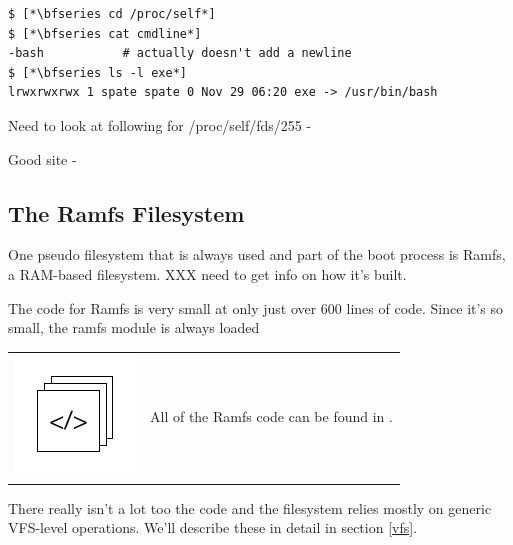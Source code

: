 \begin{lstlisting}
$ [*\bfseries cd /proc/self*]
$ [*\bfseries cat cmdline*]
-bash           # actually doesn't add a newline
$ [*\bfseries ls -l exe*]
lrwxrwxrwx 1 spate spate 0 Nov 29 06:20 exe -> /usr/bin/bash
\end{lstlisting}

Need to look at following for /proc/self/fds/255 - %

Good site - %


\subsection{The Ramfs Filesystem}\label{ramfs}

One pseudo filesystem that is always used and part of the boot process is Ramfs, a RAM-based filesystem. XXX need to get info on how it's built.

The code for Ramfs is very small at only just over 600 lines of code.  Since it's so small, the ramfs module is always loaded

\begin{table}[h]
\begin{tabular}{ll}
\parbox[l]{0.6in}{\includegraphics[scale=0.8]{figures/src-xref.pdf}} & \parbox[l]{4in}{\small{All of the Ramfs code can be found in .}}
\end{tabular}
\end{table}

\noindent
There really isn't a lot too the code and the filesystem relies mostly on generic VFS-level operations. We'll describe these in detail in section \ref{vfs}.


